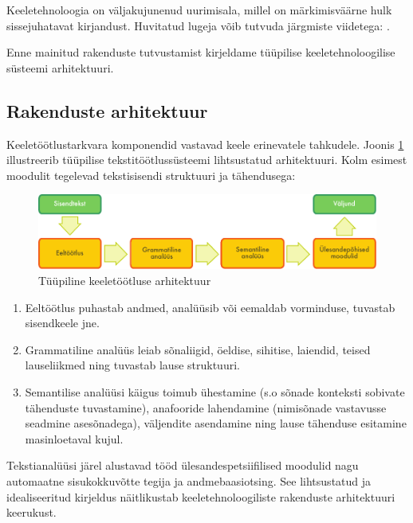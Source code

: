 \begin{multicols}{2}
Keeletehnoloogia on väljakujunenud uurimisala, millel on märkimisväärne hulk sissejuhatavat kirjandust. Huvitatud lugeja võib tutvuda järgmiste viidetega:  \cite{carstensen-etal1, jurafsky-martin01, manning-schuetze1, lt-world1, lt-survey1}.

Enne mainitud rakenduste tutvustamist kirjeldame tüüpilise keeletehnoloogilise süsteemi arhitektuuri. 

\subsection{Rakenduste arhitektuur}

Keeletöötlustarkvara komponendid vastavad keele erinevatele tahkudele.  Joonis \ref{fig:textprocessingarch_ee} illustreerib tüüpilise tekstitöötlussüsteemi lihtsustatud arhitektuuri.  Kolm esimest moodulit tegelevad tekstisisendi struktuuri ja tähendusega:

\begin{figure}[b]
  \center
  \includegraphics[width=\textwidth]{../_media/estonian/text_processing_app_architecture}
  \caption{Tüüpiline keeletöötluse arhitektuur}
  \label{fig:textprocessingarch_ee}
\end{figure}

\begin{enumerate}
\item Eeltöötlus puhastab andmed, ana\-lüüsib või eemaldab vorminduse, tuvastab sisendkeele  jne.
\item Grammatiline analüüs leiab sõna\-liigid, öeldise, sihitise, laiendid, teised lauseliikmed ning tuvastab lause struktuuri.
\item Semantilise analüüsi käigus toimub ühestamine (s.o sõnade konteksti sobivate tähenduste tuvastamine), anafooride lahendamine (nimisõnade vastavusse seadmine asesõnadega), väljendite asendamine ning lause tähenduse esitamine masinloetaval kujul.
\end{enumerate}

Tekstianalüüsi järel alustavad tööd ülesandespetsiifilised moodulid nagu automaatne sisukokkuvõtte tegija ja andmebaasiotsing. 
See lihtsustatud ja idealiseeritud kirjeldus näitlikustab keeletehnoloogiliste rakenduste arhitektuuri keerukust. 


\end{multicols}
